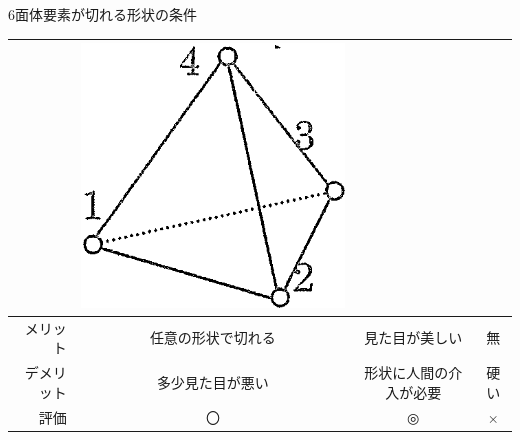 \begin{frame}{6面体要素が切れる形状の条件}
\begin{table}[hbtp]
\begin{tabular}{|r|c|c|c|}
                     & \includegraphics[keepaspectratio]{images/tet4.png}  \\
          \hline
          メリット   & 任意の形状で切れる & 見た目が美しい & 無 \\
          \hline
          デメリット & 多少見た目が悪い   & 形状に人間の介入が必要 & 硬い \\
          \hline
          評価       &   〇               & ◎              & × \\
          \hline
    \end{tabular}
  \end{table}
\end{frame}
